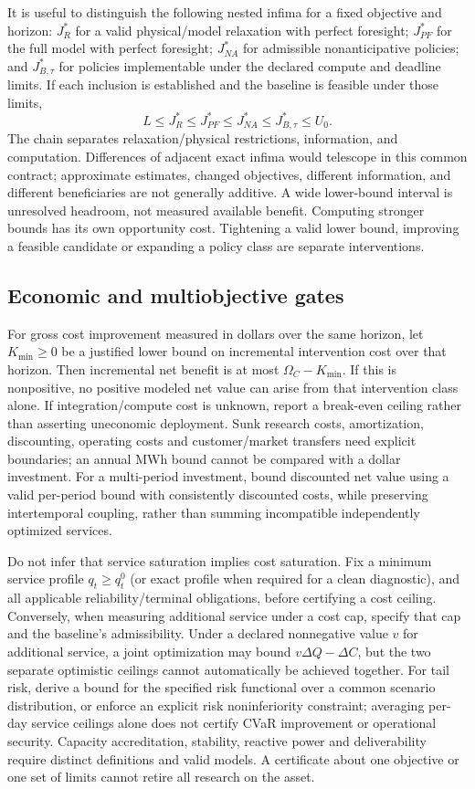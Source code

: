 \documentclass[11pt,letterpaper]{article}
\begin{document}
It is useful to distinguish the following nested infima for a fixed objective and horizon: $J_R^*$ for a valid physical/model relaxation with perfect foresight; $J_{PF}^*$ for the full model with perfect foresight; $J_{NA}^*$ for admissible nonanticipative policies; and $J_{B,\tau}^*$ for policies implementable under the declared compute and deadline limits. If each inclusion is established and the baseline is feasible under those limits,
\[
 L\le J_R^*\le J_{PF}^*\le J_{NA}^*\le J_{B,\tau}^*\le U_0.
\]
The chain separates relaxation/physical restrictions, information, and computation. Differences of adjacent exact infima would telescope in this common contract; approximate estimates, changed objectives, different information, and different beneficiaries are not generally additive. A wide lower-bound interval is unresolved headroom, not measured available benefit. Computing stronger bounds has its own opportunity cost. Tightening a valid lower bound, improving a feasible candidate or expanding a policy class are separate interventions.

\subsection{Economic and multiobjective gates}
For gross cost improvement measured in dollars over the same horizon, let $K_{\min}\ge0$ be a justified lower bound on incremental intervention cost over that horizon. Then incremental net benefit is at most $\Omega_C-K_{\min}$. If this is nonpositive, no positive modeled net value can arise from that intervention class alone. If integration/compute cost is unknown, report a break-even ceiling rather than asserting uneconomic deployment. Sunk research costs, amortization, discounting, operating costs and customer/market transfers need explicit boundaries; an annual MWh bound cannot be compared with a dollar investment. For a multi-period investment, bound discounted net value using a valid per-period bound with consistently discounted costs, while preserving intertemporal coupling, rather than summing incompatible independently optimized services.

Do not infer that service saturation implies cost saturation. Fix a minimum service profile $q_t\ge q_t^0$ (or exact profile when required for a clean diagnostic), and all applicable reliability/terminal obligations, before certifying a cost ceiling. Conversely, when measuring additional service under a cost cap, specify that cap and the baseline's admissibility. Under a declared nonnegative value $v$ for additional service, a joint optimization may bound $v\Delta Q-\Delta C$, but the two separate optimistic ceilings cannot automatically be achieved together. For tail risk, derive a bound for the specified risk functional over a common scenario distribution, or enforce an explicit risk noninferiority constraint; averaging per-day service ceilings alone does not certify CVaR improvement or operational security. Capacity accreditation, stability, reactive power and deliverability require distinct definitions and valid models. A certificate about one objective or one set of limits cannot retire all research on the asset.
\end{document}
